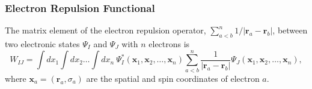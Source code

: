 \documentclass[journal=jpclcd,manuscript=letter]{achemso}
\newcommand\m[1]{\mathbf{#1}}
\renewcommand\vec[1]{\mathbf{#1}}
\begin{document}
\subsubsection{Electron Repulsion Functional}
The matrix element of the electron repulsion operator, $\sum_{a < b}^{n} 1/\vert \vec{r}_a - \vec{r}_b \vert$,
between two electronic states $\Psi_I$ and $\Psi_J$ with $n$ electrons is
\begin{equation}
 W_{IJ} = 
\int dx_1 \int dx_2 \ldots \int dx_{n} ~ \Psi_{I}^*(\vec{x}_1, \vec{x}_2, \ldots, \vec{x}_n)
\sum_{a < b}^{n} \frac{1}{\vert \vec{r}_a - \vec{r}_b \vert}
\Psi_{J}(\vec{x}_1, \vec{x}_2, \ldots, \vec{x}_n), \label{eqn:electron_repulsion_exact}
\end{equation}
where $\vec{x}_a = (\vec{r}_a, \sigma_a)$ are the spatial and spin coordinates of electron $a$.
\end{document}
